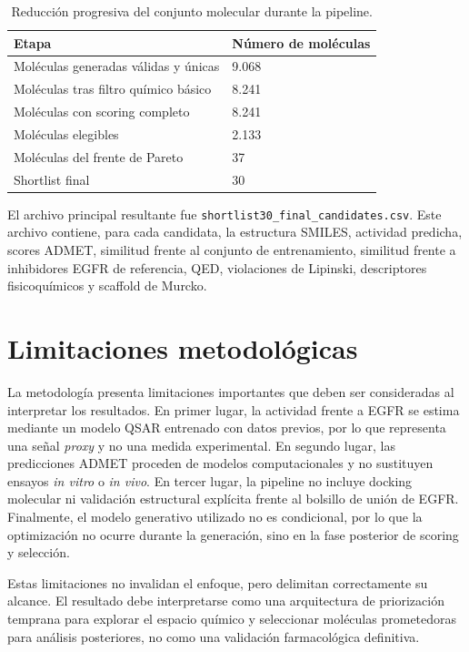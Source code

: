 \documentclass[IB]{TFUOC}%
\begin{document}
\begin{table}[H]
    \centering
    \small
    \begin{tabular}{p{7cm} p{3cm}}
        \hline
        \textbf{Etapa} & \textbf{Número de moléculas} \\
        \hline
        Moléculas generadas válidas y únicas & 9.068 \\
        \hline
        Moléculas tras filtro químico básico & 8.241 \\
        \hline
        Moléculas con scoring completo & 8.241 \\
        \hline
        Moléculas elegibles & 2.133 \\
        \hline
        Moléculas del frente de Pareto & 37 \\
        \hline
        Shortlist final & 30 \\
        \hline
    \end{tabular}
    \caption{Reducción progresiva del conjunto molecular durante la pipeline.}
    \label{tab:reduccion_pipeline}
\end{table}

El archivo principal resultante fue \texttt{shortlist30\_final\_candidates.csv}. Este archivo contiene, para cada candidata, la estructura SMILES, actividad predicha, scores ADMET, similitud frente al conjunto de entrenamiento, similitud frente a inhibidores EGFR de referencia, QED, violaciones de Lipinski, descriptores fisicoquímicos y scaffold de Murcko.

\section{Limitaciones metodológicas}

La metodología presenta limitaciones importantes que deben ser consideradas al interpretar los resultados. En primer lugar, la actividad frente a EGFR se estima mediante un modelo QSAR entrenado con datos previos, por lo que representa una señal \textit{proxy} y no una medida experimental. En segundo lugar, las predicciones ADMET proceden de modelos computacionales y no sustituyen ensayos \textit{in vitro} o \textit{in vivo}. En tercer lugar, la pipeline no incluye docking molecular ni validación estructural explícita frente al bolsillo de unión de EGFR. Finalmente, el modelo generativo utilizado no es condicional, por lo que la optimización no ocurre durante la generación, sino en la fase posterior de scoring y selección.

Estas limitaciones no invalidan el enfoque, pero delimitan correctamente su alcance. El resultado debe interpretarse como una arquitectura de priorización temprana para explorar el espacio químico y seleccionar moléculas prometedoras para análisis posteriores, no como una validación farmacológica definitiva.
\end{document}
